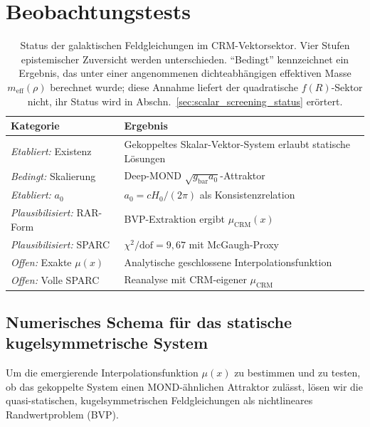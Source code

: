 \documentclass[aps,prd,twocolumn,superscriptaddress,nofootinbib]{revtex4-2}
\begin{document}
\section{Beobachtungstests}
\label{sec:tests}

\begin{table}[tbp]
\caption{\label{tab:galactic_status}Status der galaktischen Feldgleichungen im CRM-Vektorsektor. Vier Stufen epistemischer Zuversicht werden unterschieden. ``Bedingt'' kennzeichnet ein Ergebnis, das unter einer angenommenen dichteabh\"angigen effektiven Masse $m_{\mathrm{eff}}(\rho)$ berechnet wurde; diese Annahme liefert der quadratische $f(R)$-Sektor nicht, ihr Status wird in Abschn.~\ref{sec:scalar_screening_status} er\"ortert.}
\begin{ruledtabular}
\begin{tabular}{ll}
\textbf{Kategorie} & \textbf{Ergebnis} \\
\hline
\textit{Etabliert:} Existenz & Gekoppeltes Skalar-Vektor-System erlaubt statische L\"osungen \\
\textit{Bedingt:} Skalierung & Deep-MOND $\sqrt{g_{\mathrm{bar}} a_0}$-Attraktor \\
\textit{Etabliert:} $a_0$ & $a_0 = cH_0/(2\pi)$ als Konsistenzrelation \\
\hline
\textit{Plausibilisiert:} RAR-Form & BVP-Extraktion ergibt $\mu_{\mathrm{CRM}}(x)$ \\
\textit{Plausibilisiert:} SPARC & $\chi^2/\mathrm{dof} = 9{,}67$ mit McGaugh-Proxy \\
\hline
\textit{Offen:} Exakte $\mu(x)$ & Analytische geschlossene Interpolationsfunktion \\
\textit{Offen:} Volle SPARC & Reanalyse mit CRM-eigener $\mu_{\mathrm{CRM}}$ \\
\end{tabular}
\end{ruledtabular}
\end{table}

\subsection{Numerisches Schema f\"ur das statische kugelsymmetrische System}
\label{sec:numerical_scheme}

Um die emergierende Interpolationsfunktion $\mu(x)$ zu bestimmen und zu testen, ob das gekoppelte System einen MOND-\"ahnlichen Attraktor zul\"asst, l\"osen wir die quasi-statischen, kugelsymmetrischen Feldgleichungen als nichtlineares Randwertproblem (BVP).
\end{document}
